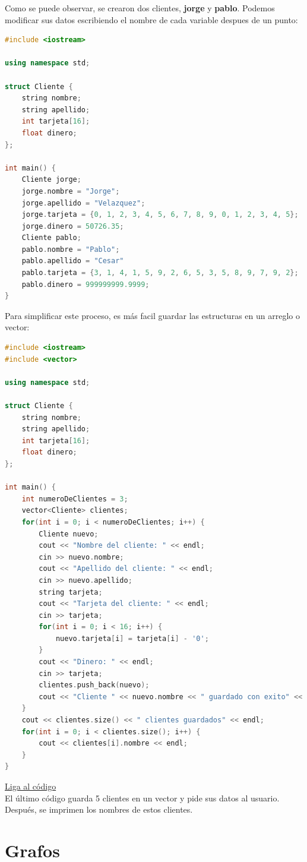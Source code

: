 \documentclass{article}
\begin{document}
Como se puede observar, se crearon dos clientes, \textbf{jorge} y \textbf{pablo}. Podemos modificar sus datos escribiendo el nombre de cada variable despues de un punto:

\begin{lstlisting}[language=C++, title=Modificando valores]
#include <iostream>

using namespace std;

struct Cliente {
	string nombre;
	string apellido;
	int tarjeta[16];
	float dinero;
};

int main() {
	Cliente jorge;
	jorge.nombre = "Jorge";
	jorge.apellido = "Velazquez";
	jorge.tarjeta = {0, 1, 2, 3, 4, 5, 6, 7, 8, 9, 0, 1, 2, 3, 4, 5};
	jorge.dinero = 50726.35;
	Cliente pablo;
	pablo.nombre = "Pablo";
	pablo.apellido = "Cesar"
	pablo.tarjeta = {3, 1, 4, 1, 5, 9, 2, 6, 5, 3, 5, 8, 9, 7, 9, 2};
	pablo.dinero = 999999999.9999;
}
\end{lstlisting}

Para simplificar este proceso, es más facil guardar las estructuras en un arreglo o vector:

\begin{lstlisting}[language=C++, title=Clientes bancarios]
#include <iostream>
#include <vector>

using namespace std;

struct Cliente {
	string nombre;
	string apellido;
	int tarjeta[16];
	float dinero;
};

int main() {
	int numeroDeClientes = 3;
	vector<Cliente> clientes;
	for(int i = 0; i < numeroDeClientes; i++) {
		Cliente nuevo;
		cout << "Nombre del cliente: " << endl;
		cin >> nuevo.nombre;
		cout << "Apellido del cliente: " << endl;
		cin >> nuevo.apellido;
		string tarjeta;
		cout << "Tarjeta del cliente: " << endl;
		cin >> tarjeta;
		for(int i = 0; i < 16; i++) {
			nuevo.tarjeta[i] = tarjeta[i] - '0';
		}
		cout << "Dinero: " << endl;
		cin >> tarjeta;
		clientes.push_back(nuevo);
		cout << "Cliente " << nuevo.nombre << " guardado con exito" << endl;
	}
	cout << clientes.size() << " clientes guardados" << endl;
	for(int i = 0; i < clientes.size(); i++) {
		cout << clientes[i].nombre << endl;
	}
}
\end{lstlisting}
\href{https://repl.it/@Jamesscn/Structs}{Liga al código} \\

El último código guarda 5 clientes en un vector y pide sus datos al usuario. Después, se imprimen los nombres de estos clientes.

\section{Grafos}
\end{document}
